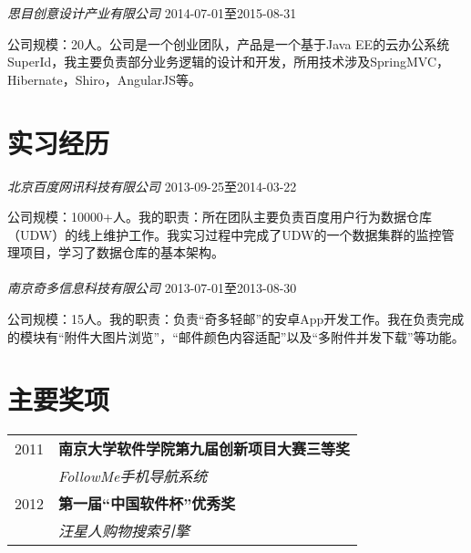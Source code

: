 \documentclass[10pt]{article} %
\begin{document}
{\begin{minipage}[t]{0.44\textwidth}
{\large \textit{思目创意设计产业有限公司}} \hfill  \hfill {\textsc{2014-07-01至2015-08-31}}

\normalsize{公司规模：20人。公司是一个创业团队，产品是一个基于Java EE的云办公系统SuperId，我主要负责部分业务逻辑的设计和开发，所用技术涉及SpringMVC，Hibernate，Shiro，AngularJS等。}\\



\section{实习经历} 

{\large \textit{北京百度网讯科技有限公司}} \hfill  \hfill {\textsc{2013-09-25至2014-03-22}}

\normalsize{公司规模：10000+人。我的职责：所在团队主要负责百度用户行为数据仓库（UDW）的线上维护工作。我实习过程中完成了UDW的一个数据集群的监控管理项目，学习了数据仓库的基本架构。}\\\\
{\large \textit{南京奇多信息科技有限公司}} \hfill  \hfill {\textsc{2013-07-01至2013-08-30}}

\normalsize{公司规模：15人。我的职责：负责“奇多轻邮”的安卓App开发工作。我在负责完成的模块有“附件大图片浏览”，“邮件颜色内容适配”以及“多附件并发下载”等功能。}\\ 


\section{主要奖项} 

\begin{tabular}{rl}

2011	 & \textbf{南京大学软件学院第九届创新项目大赛三等奖}\\
& \textit{FollowMe手机导航系统}\\ 


2012	 & \textbf{第一届“中国软件杯”优秀奖}\\
& \textit{汪星人购物搜索引擎}\\ 


\end{tabular}
\end{minipage}}
\end{document}
